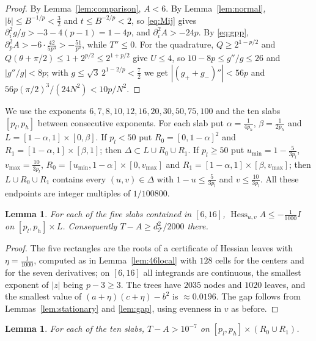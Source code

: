 \documentclass[11pt]{amsart}
\newtheorem{lemma}[theorem]{Lemma}
\theoremstyle{definition}
\theoremstyle{remark}
\numberwithin{equation}{section}
\newcommand{\Hess}{\operatorname{Hess}}
\newcommand{\cT}{\mathcal{T}}
\begin{document}
\begin{proof}
By Lemma~\ref{lem:comparison}, $A<6$. By Lemma~\ref{lem:normal}, $|b|\le B^{-1/p}<\frac32$ and $t\le B^{-2/p}<2$, so \eqref{eq:Mij} gives $\partial_i^2g/g>-3-4(p-1)=1-4p$, and $\partial_i^2A>-24p$. By \eqref{eq:gpp}, $\partial_p^2A>-6\cdot\frac{42}{5p^3}>-\frac{51}{p^3}$, while $T''\le0$. For the quadrature, $Q\ge2^{1-p/2}$ and $Q(\theta+\pi/2)\le1+2^{p/2}\le2^{1+p/2}$ give $U\le4$, so $10-8p\le g''/g\le26$ and $|g''/g|<8p$; with $g\le\sqrt3\,2^{1-2/p}<\frac72$ we get $|(g_++g_-)''|<56p$ and $56p(\pi/2)^3/(24N^2)<10p/N^2$.
\end{proof}

We use the exponents $6,7,8,10,12,16,20,30,50,75,100$ and the ten slabs $[p_l,p_h]$ between consecutive exponents. For each slab put $\alpha=\frac1{4p_h}$, $\beta=\frac1{2p_h}$ and $L=[1-\alpha,1]\times[0,\beta]$. If $p_l<50$ put $R_0=[0,1-\alpha]^2$ and $R_1=[1-\alpha,1]\times[\beta,1]$; then $\Delta\subset L\cup R_0\cup R_1$. If $p_l\ge50$ put $u_{\min}=1-\frac5{3p_l}$, $v_{\max}=\frac{10}{3p_l}$, $R_0=[u_{\min},1-\alpha]\times[0,v_{\max}]$ and $R_1=[1-\alpha,1]\times[\beta,v_{\max}]$; then $L\cup R_0\cup R_1$ contains every $(u,v)\in\Delta$ with $1-u\le\frac5{3p_l}$ and $v\le\frac{10}{3p_l}$. All these endpoints are integer multiples of $1/100800$.

\begin{lemma}\label{lem:6local}
For each of the five slabs contained in $[6,16]$, $\Hess_{u,v}A\le-\frac1{1000}I$ on $[p_l,p_h]\times L$. Consequently $T-A\ge d_\cT^2/2000$ there.
\end{lemma}

\begin{proof}
The five rectangles are the roots of a certificate of Hessian leaves with $\eta=\frac1{1000}$, computed as in Lemma~\ref{lem:46local} with $128$ cells for the centers and for the seven derivatives; on $[6,16]$ all integrands are continuous, the smallest exponent of $|z|$ being $p-3\ge3$. The trees have $2035$ nodes and $1020$ leaves, and the smallest value of $(a+\eta)(c+\eta)-b^2$ is $\approx0.0196$. The gap follows from Lemmas~\ref{lem:stationary} and \ref{lem:gap}, using evenness in $v$ as before.
\end{proof}

\begin{lemma}\label{lem:6compl}
For each of the ten slabs, $T-A>10^{-7}$ on $[p_l,p_h]\times(R_0\cup R_1)$.
\end{lemma}
\end{document}
